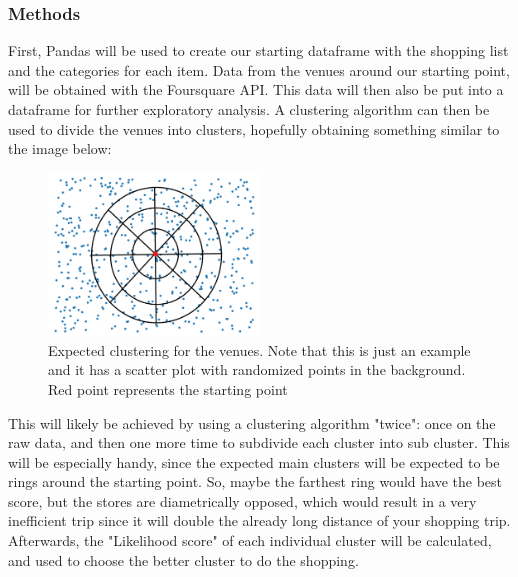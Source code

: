 \documentclass{article}
\begin{document}
		\subsubsection{Methods}
			First, Pandas will be used to create our starting dataframe with the shopping list and the categories for each item. Data from the venues around our starting point, will be obtained with the Foursquare API. This data will then also be put into a dataframe for further exploratory analysis. A clustering algorithm can then be used to divide the venues into clusters, hopefully obtaining something similar to the image below:
			
			\begin{figure}[H]
				\centering
				\includegraphics[width=0.5\textwidth]{img/Expected.png}
				\caption{Expected clustering for the venues. Note that this is just an example and it has a scatter plot with randomized points in the background. Red point represents the starting point}
			\end{figure}
		
		
			This will likely be achieved by using a clustering algorithm "twice": once on the raw data, and then one more time to subdivide each cluster into sub cluster. This will be especially handy, since the expected main clusters will be expected to be rings around the starting point. So, maybe the farthest ring would have the best score, but the stores are diametrically opposed, which would result in a very inefficient trip since it will double the already long distance of your shopping trip.
			\newline
			\newline			
			Afterwards, the "Likelihood score" of each individual cluster will be calculated, and used to choose the better cluster to do the shopping.
	
	
	
	
	
	
	
	
	
\end{document}
